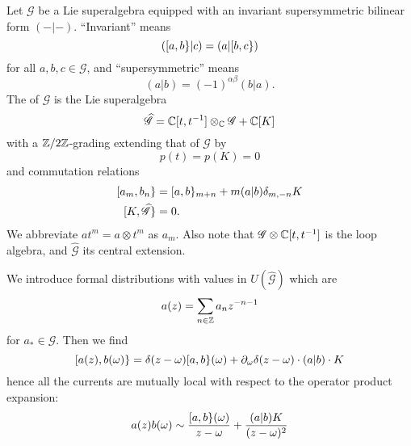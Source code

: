 \M
Let $\mathscr{G}$ be a Lie superalgebra equipped with an invariant
supersymmetric bilinear form $(-|-)$. ``Invariant'' means
\begin{equation}
([a,b\}|c)=(a|[b,c\})
\end{equation}
for all $a,b,c\in\mathscr{G}$, and ``supersymmetric'' means
\begin{equation}
(a|b)=(-1)^{\alpha\beta}(b|a).
\end{equation}
The  of $\mathscr{G}$ is the Lie superalgebra
\begin{equation}
\widehat{\mathscr{G}}=\mathbb{C}[t,t^{-1}]\otimes_{\mathbb{C}}\mathscr{G}+\mathbb{C}[K]
\end{equation}
with a $\mathbb{Z}/2\mathbb{Z}$-grading extending that of $\mathscr{G}$ by
\begin{equation}
p(t)=p(K)=0
\end{equation}
and commutation relations
\begin{equation}
\begin{split}
\superb{a_m}{b_n} &= \superb{a}{b}_{m+n}+m(a|b)\delta_{m,-n}K\\
\superb{K}{\widehat{\mathscr{G}}}&=0.
\end{split}
\end{equation}
We abbreviate $at^{m}=a\otimes t^{m}$ as $a_{m}$. Also note that
$\mathscr{G}\otimes\mathbb{C}[t,t^{-1}]$ is the loop algebra, and
$\widehat{\mathscr{G}}$ its central extension.

\M
We introduce formal distributions with values in
$U(\widehat{\mathscr{G}})$ which are 
\begin{equation}
a(z)=\sum_{n\in\mathbb{Z}}a_{n}z^{-n-1}
\end{equation}
for $a_{*}\in\mathscr{G}$. Then we find
\begin{equation}
[a(z),b(\omega)\} 
= \delta(z-\omega)[a,b\}(\omega) 
+ \partial_{\omega}\delta(z-\omega)\cdot(a|b)\cdot{K}
\end{equation}
hence all the currents are mutually local with respect to the operator
product expansion:
\begin{equation}
a(z)b(\omega)
\sim \frac{[a,b\}(\omega)}{z-\omega}
+ \frac{(a|b)K}{(z-\omega)^{2}}
\end{equation}

